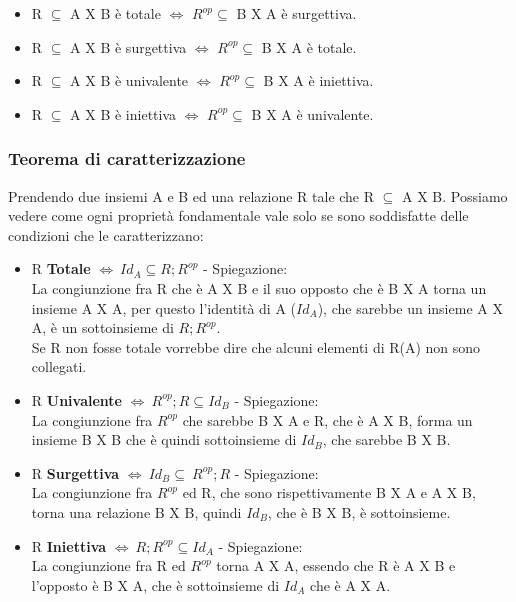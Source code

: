 \begin{itemize}
    \item R $\subseteq$ A X B è totale $\Longleftrightarrow$ $R^{op} \subseteq$ B X A è surgettiva.
    \item R $\subseteq$ A X B è surgettiva $\Longleftrightarrow$ $R^{op} \subseteq$ B X A è totale.
    \item R $\subseteq$ A X B è univalente $\Longleftrightarrow$ $R^{op} \subseteq$ B X A è iniettiva.
    \item R $\subseteq$ A X B è iniettiva $\Longleftrightarrow$ $R^{op} \subseteq$ B X A è univalente.
\end{itemize}

\subsubsection{Teorema di caratterizzazione}\label{teorema-caratterizzazione}
Prendendo due insiemi A e B ed una relazione R tale che R $\subseteq$ A X B. Possiamo vedere come ogni proprietà fondamentale vale solo se sono soddisfatte delle condizioni che le caratterizzano:
\begin{itemize}
    \item R \textbf{Totale} $\Longleftrightarrow \: Id_A \subseteq R;R^{op}$ - Spiegazione:\\
    La congiunzione fra R che è A X B e il suo opposto che è B X A torna un insieme A X A, per questo l'identità di A ($Id_A$), che sarebbe un insieme A X A, è un sottoinsieme di $R;R^{op}$.\\
    Se R non fosse totale vorrebbe dire che alcuni elementi di R(A) non sono collegati.
    \item R \textbf{Univalente} $\Longleftrightarrow \: R^{op};R \subseteq Id_B$ - Spiegazione:\\
    La congiunzione fra $R^{op}$ che sarebbe B X A e R, che è A X B, forma un insieme B X B che è quindi sottoinsieme di $Id_B$, che sarebbe B X B.
    \item R \textbf{Surgettiva} $\Longleftrightarrow \: Id_B \subseteq \: R^{op};R$ - Spiegazione:\\
    La congiunzione fra $R^{op}$ ed R, che sono rispettivamente B X A e A X B, torna una relazione B X B, quindi $Id_B$, che è B X B, è sottoinsieme.
    \item R \textbf{Iniettiva} $\Longleftrightarrow \: R;R^{op} \subseteq Id_A$ - Spiegazione: \\
    La congiunzione fra R ed $R^{op}$ torna A X A, essendo che R è A X B e l'opposto è B X A, che è sottoinsieme di $Id_A$ che è A X A.
\end{itemize}

